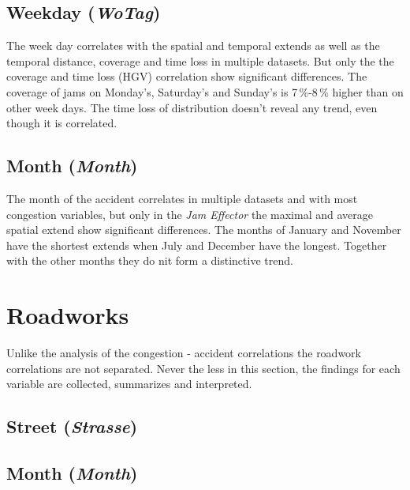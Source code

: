 \subsection{Weekday (\textit{WoTag})}
\label{analysis_sum_WoTag}
The week day correlates with the spatial and temporal extends as well as the temporal distance, coverage and time loss in multiple datasets. But only the the coverage and time loss (HGV) correlation show significant differences. The coverage of jams on Monday's, Saturday's and Sunday's is 7\,\%-8\,\% higher than on other week days. The time loss of distribution doesn't reveal any trend, even though it is correlated.

\subsection{Month (\textit{Month})}
\label{analysis_sum_Month}
The month of the accident correlates in multiple datasets and with most congestion variables, but only in the \textit{Jam Effector} the maximal and average spatial extend show significant differences. The months of January and November have the shortest extends when July and December have the longest. Together with the other months they do nit form a distinctive trend. 

\section{Roadworks}

Unlike the analysis of the congestion - accident correlations the roadwork correlations are not separated. Never the less in this section, the findings for each variable are collected, summarizes and interpreted. 

\subsection{Street (\textit{Strasse})}

\subsection{Month (\textit{Month})}


